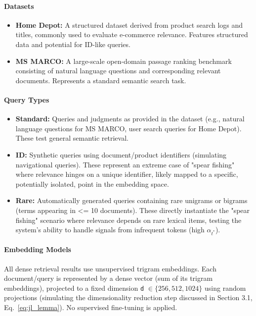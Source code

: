 \documentclass[manuscript]{acmart}
\begin{document}
\paragraph{Datasets}
\begin{itemize}
    \item \textbf{Home Depot:} A structured dataset derived from product search logs and titles, commonly used to evaluate e-commerce relevance. Features structured data and potential for ID-like queries.
    \item \textbf{MS MARCO:} A large-scale open-domain passage ranking benchmark consisting of natural language questions and corresponding relevant documents. Represents a standard semantic search task.
\end{itemize}

\paragraph{Query Types}
\begin{itemize}
    \item \textbf{Standard:} Queries and judgments as provided in the dataset (e.g., natural language questions for MS MARCO, user search queries for Home Depot). These test general semantic retrieval.
    \item \textbf{ID:} Synthetic queries using document/product identifiers (simulating navigational queries). These represent an extreme case of "spear fishing" where relevance hinges on a unique identifier, likely mapped to a specific, potentially isolated, point in the embedding space.
    \item \textbf{Rare:} Automatically generated queries containing rare unigrams or bigrams (terms appearing in <= 10 documents). These directly instantiate the "spear fishing" scenario where relevance depends on rare lexical items, testing the system's ability to handle signals from infrequent tokens (high $\alpha_{t^*}$).
\end{itemize}

\paragraph{Embedding Models}
All dense retrieval results use unsupervised trigram embeddings. Each document/query is represented by a dense vector (sum of its trigram embeddings), projected to a fixed dimension \texttt{d} $\in \{256, 512, 1024\}$ using random projections (simulating the dimensionality reduction step discussed in Section 3.1, Eq.~\ref{eq:jl_lemma}). No supervised fine-tuning is applied.
\end{document}
